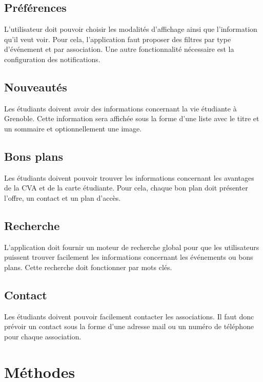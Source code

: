 \documentclass[a4paper, 11px]{article}
\begin{document}
\subsection{Préférences}

L'utilisateur doit pouvoir choisir les modalités d'affichage ainsi que l'information qu'il veut voir. Pour cela, l'application faut proposer des filtres par type d'événement et par association. Une autre fonctionnalité nécessaire est la configuration des notifications.

\subsection{Nouveautés}

Les étudiants doivent avoir des informations concernant la vie étudiante à Grenoble. Cette information sera affichée sous la forme d'une liste avec le titre et un sommaire et optionnellement une image.

\subsection{Bons plans}

Les étudiants doivent pouvoir trouver les informations concernant les avantages de la CVA et de la carte étudiante. Pour cela, chaque bon plan doit présenter l'offre, un contact et un plan d'accès.

\subsection{Recherche}

L'application doit fournir un moteur de recherche global pour que les utilisateurs puissent trouver facilement les informations concernant les événements ou bons plans. Cette recherche doit fonctionner par mots clés.

\subsection{Contact}

Les étudiants doivent pouvoir facilement contacter les associations. Il faut donc prévoir un contact sous la forme d'une adresse mail ou un numéro de téléphone pour chaque association.

\newpage

\section{Méthodes}
\end{document}

